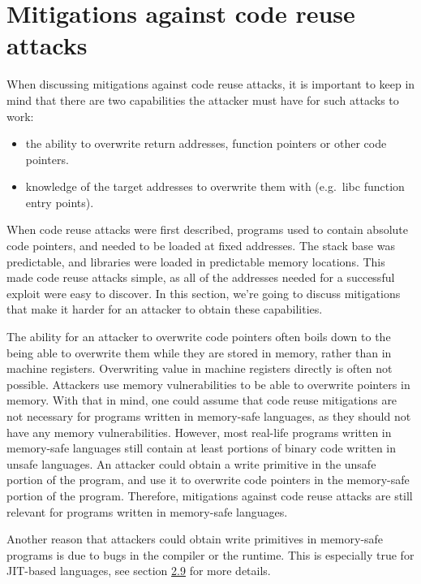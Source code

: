 \documentclass[
  a4paper,
]{report}
\providecommand{\tightlist}{%
  \setlength{\itemsep}{0pt}\setlength{\parskip}{0pt}}
\begin{document}
\section{Mitigations against code reuse
attacks}\label{mitigations-against-code-reuse-attacks}

When discussing mitigations against code reuse attacks, it is important
to keep in mind that there are two capabilities the attacker must have
for such attacks to work:

\begin{itemize}
\tightlist
\item
  the ability to overwrite return addresses, function pointers or other
  code pointers.
\item
  knowledge of the target addresses to overwrite them with (e.g.~libc
  function entry points).
\end{itemize}

When code reuse attacks were first described, programs used to contain
absolute code pointers, and needed to be loaded at fixed addresses. The
stack base was predictable, and libraries were loaded in predictable
memory locations. This made code reuse attacks simple, as all of the
addresses needed for a successful exploit were easy to discover. In this
section, we're going to discuss mitigations that make it harder for an
attacker to obtain these capabilities.

The ability for an attacker to overwrite code pointers often boils down
to the being able to overwrite them while they are stored in memory,
rather than in machine
\label{__index_entry_28}{registers}.
Overwriting value in machine registers directly is often not possible.
Attackers use \label{__index_entry_29}{memory
vulnerabilities} to be able to overwrite
pointers in memory. With that in mind, one could assume that code reuse
mitigations are not necessary for programs written in memory-safe
languages, as they should not have any memory vulnerabilities. However,
most real-life programs written in memory-safe languages still contain
at least portions of binary code written in unsafe languages. An
attacker could obtain a write primitive in the unsafe portion of the
program, and use it to overwrite code pointers in the memory-safe
portion of the program. Therefore, mitigations against code reuse
attacks are still relevant for programs written in memory-safe
languages.

Another reason that attackers could obtain write primitives in
memory-safe programs is due to bugs in the compiler or the runtime. This
is especially true for JIT-based languages, see section
\hyperref[sec:jit-compiler-vulnerabilities]{2.9} for more details.
\end{document}
